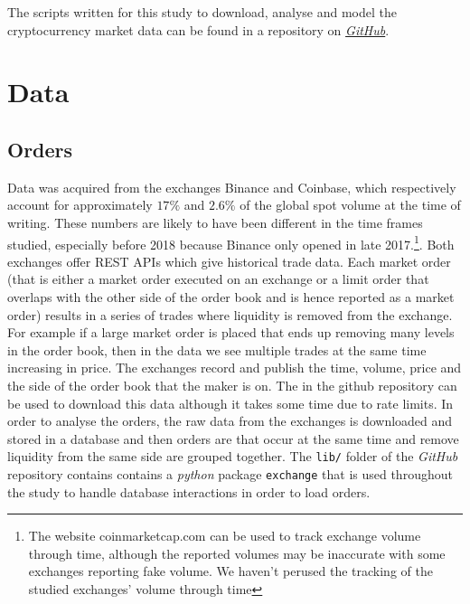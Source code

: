 \documentclass[a4paper,10pt]{article}
\begin{document}
The scripts written for this study to download, analyse and model the cryptocurrency market data can be found in a repository on \href{http://github.com/alfredholmes/cryptocurrency_data_analysis}{\emph{GitHub}}.
\section{Data}
\subsection{Orders}
Data was acquired from the exchanges Binance and Coinbase, which respectively account for approximately $17\%$ and $2.6\%$ of the global spot volume at the time of writing.\cite{FTX} These numbers are likely to have been different in the time frames studied, especially before 2018 because Binance only opened in late 2017.\footnote{The website coinmarketcap.com can be used to track exchange volume through time, although the reported volumes may be inaccurate with some exchanges reporting fake volume. We haven't perused the tracking of the studied exchanges' volume through time}. Both exchanges offer REST APIs\cite{binance}\cite{coinbase} which give historical trade data. Each market order (that is either a market order executed on an exchange or a limit order that overlaps with the other side of the order book and is hence reported as a market order) results in a series of trades where liquidity is removed from the exchange. For example if a large market order is placed that ends up removing many levels in the order book, then in the data we see multiple trades at the same time increasing in price. The exchanges record and publish the time, volume, price and the side of the order book that the maker is on. The in the github repository can be used to download this data although it takes some time due to rate limits. In order to analyse the orders, the raw data from the exchanges is downloaded and stored in a database and then orders are that occur at the same time and remove liquidity from the same side are grouped together. The \texttt{lib/} folder of the \emph{GitHub} repository contains contains a \emph{python} package \texttt{exchange} that is used throughout the study to handle database interactions in order to load orders.  
\end{document}
